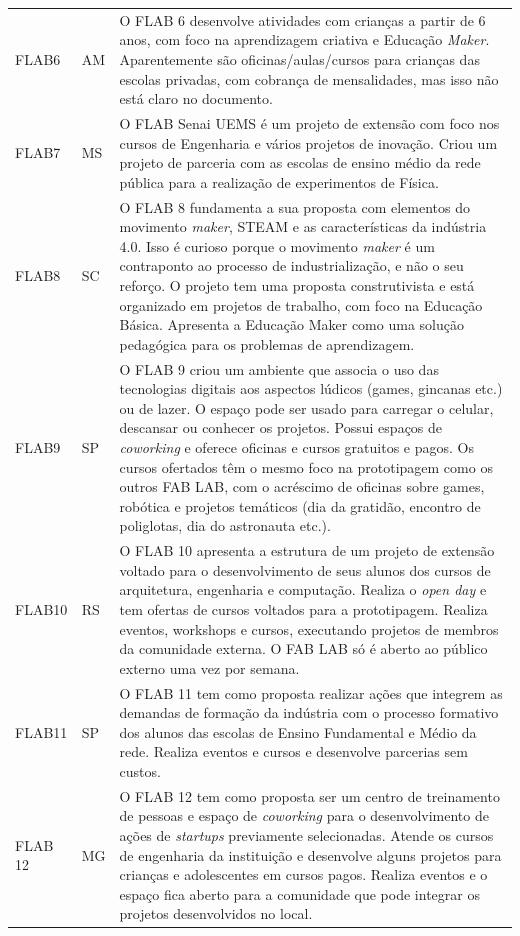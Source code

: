 \documentclass[portuguese]{textolivre}
\begin{document}
\begin{footnotesize}
\begin{longtable}{p{1cm} p{1cm} p{11.5cm}}
FLAB6 & AM & O FLAB 6 desenvolve atividades com crianças a partir de 6 anos, com foco na aprendizagem criativa e Educação \textit{Maker}. Aparentemente são oficinas/aulas/cursos para crianças das escolas privadas, com cobrança de mensalidades, mas isso não está claro no documento. \\
FLAB7 & MS & O FLAB Senai UEMS é um projeto de extensão com foco nos cursos de Engenharia e vários projetos de inovação. Criou um projeto de parceria com as escolas de ensino médio da rede pública para a realização de experimentos de Física. \\
FLAB8 & SC & O FLAB 8 fundamenta a sua proposta com elementos do movimento \textit{maker}, STEAM e as características da indústria 4.0. Isso é curioso porque o movimento \textit{maker} é um contraponto ao processo de industrialização, e não o seu reforço. O projeto tem uma proposta construtivista e está organizado em projetos de trabalho, com foco na Educação Básica. Apresenta a Educação Maker como uma solução pedagógica para os problemas de aprendizagem. \\
FLAB9 & SP & O FLAB 9 criou um ambiente que associa o uso das tecnologias digitais aos aspectos lúdicos (games, gincanas etc.) ou de lazer. O espaço pode ser usado para carregar o celular, descansar ou conhecer os projetos. Possui espaços de \textit{coworking} e oferece oficinas e cursos gratuitos e pagos. Os cursos ofertados têm o mesmo foco na prototipagem como os outros FAB LAB, com o acréscimo de oficinas sobre games, robótica e projetos temáticos (dia da gratidão, encontro de poliglotas, dia do astronauta etc.). \\
FLAB10 & RS & O FLAB 10 apresenta a estrutura de um projeto de extensão voltado para o desenvolvimento de seus alunos dos cursos de arquitetura, engenharia e computação. Realiza o \textit{open day} e tem ofertas de cursos voltados para a prototipagem. Realiza eventos, workshops e cursos, executando projetos de membros da comunidade externa. O FAB LAB só é aberto ao público externo uma vez por semana. \\
FLAB11 & SP & O FLAB 11 tem como proposta realizar ações que integrem as demandas de formação da indústria com o processo formativo dos alunos das escolas de Ensino Fundamental e Médio da rede. Realiza eventos e cursos e desenvolve parcerias sem custos. \\
FLAB 12 & MG & O FLAB 12 tem como proposta ser um centro de treinamento de pessoas e espaço de \textit{coworking} para o desenvolvimento de ações de \textit{startups} previamente selecionadas. Atende os cursos de engenharia da instituição e desenvolve alguns projetos para crianças e adolescentes em cursos pagos. Realiza eventos e o espaço fica aberto para a comunidade que pode integrar os projetos desenvolvidos no local. \\

\end{longtable}
\end{footnotesize}
\end{document}
